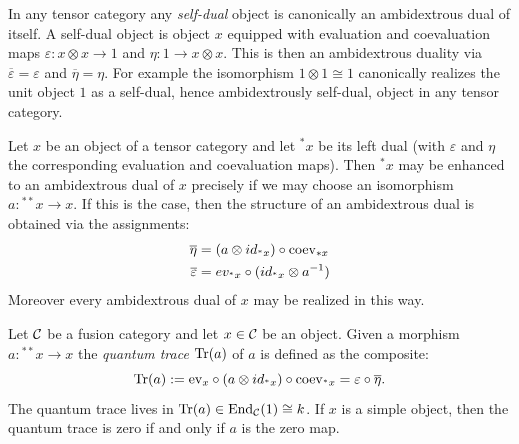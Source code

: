 \documentclass{amsart}
\begin{document}
\begin{example}
	In any tensor category any {\em self-dual} object is canonically an ambidextrous dual of itself. A self-dual object is object $x$ equipped with evaluation and coevaluation maps $\varepsilon: x \otimes x \to 1$ and $\eta: 1 \to x \otimes x$. This is then an ambidextrous duality via $\overline{\varepsilon} = \varepsilon$ and $\overline{\eta} = \eta$. For example the isomorphism $1 \otimes 1 \cong 1$ canonically realizes the unit object $1$ as a self-dual, hence ambidextrously self-dual, object in any tensor category.  
\end{example}

\begin{example}
	Let $x$ be an object of a tensor category and let ${}^*x$ be its left dual (with $\varepsilon$ and $\eta$ the corresponding evaluation and coevaluation maps). Then ${}^*x$ may be enhanced to an ambidextrous dual of $x$ precisely if we may choose an isomorphism $a: {}^{**}x \to x$. If this is the case, then the structure of an ambidextrous dual is obtained via the assignments:
	\begin{align*}
		\overline{\eta} &= (a \otimes id_{{}^*x}) \circ \mathrm{coev}_{*x} \\
		\overline{\varepsilon} &= ev_{{}^*x} \circ (id_{{}^*x} \otimes a^{-1})
	\end{align*}
	Moreover every ambidextrous dual of $x$ may be realized in this way.  
\end{example}

Let $\mathcal C$ be a fusion category and let $x \in \mathcal C$ be an object. Given a morphism $a: {}^{**}x \to x$ the {\em quantum trace} $\mathrm{Tr}(a)$ of $a$ is defined as the composite: %
\begin{equation*}
	\mathrm{Tr}(a) := \mathrm{ev}_x \circ (a \otimes id_{{}^*x}) \circ \mathrm{coev}_{{}^*x} = \varepsilon \circ \overline{\eta}.
\end{equation*}
The quantum trace lives in $\mathrm{Tr}(a) \in \operatorname{End}_\mathcal C(1) \cong k$. If $x$ is a simple object, then the quantum trace is zero if and only if $a$ is the zero map. 
\end{document}
